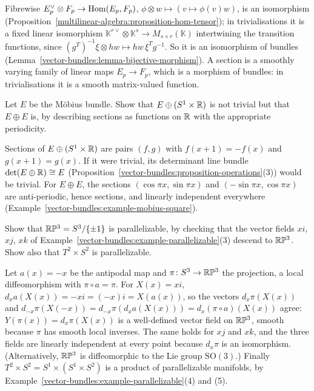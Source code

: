 \begin{solution}
Fibrewise $E_p^\vee \otimes F_p \to \operatorname{Hom}(E_p, F_p)$, $\phi \otimes w \mapsto (v \mapsto \phi(v)w)$, is an isomorphism (Proposition~\ref{multilinear-algebra:proposition-hom-tensor}); in trivialisations
it is a fixed linear isomorphism $\mathbb{K}^{r\vee} \otimes \mathbb{K}^s \to M_{s \times r}(\mathbb{K})$ intertwining the transition functions, since $(g^T)^{-1}\xi \otimes hw \mapsto hw\,\xi^Tg^{-1}$. So
it is an isomorphism of bundles (Lemma~\ref{vector-bundles:lemma-bijective-morphism}). A section is a smoothly varying family of linear maps $E_p \to F_p$, which is a morphism of bundles:
in trivialisations it is a smooth matrix-valued function.
\end{solution}

\begin{exercise}\label{vector-bundles:exercise-sum-mobius-explicit}
Let $E$ be the M\"obius bundle. Show that $E \oplus (S^1 \times \mathbb{R})$ is not trivial but that $E \oplus E$ is, by describing sections as functions on $\mathbb{R}$ with the appropriate periodicity.
\end{exercise}

\begin{solution}
Sections of $E \oplus (S^1 \times \mathbb{R})$ are pairs $(f, g)$ with $f(x + 1) = -f(x)$ and $g(x + 1) = g(x)$. If it were trivial, its determinant line bundle $\det(E \oplus \mathbb{R}) \cong E$
(Proposition~\ref{vector-bundles:proposition-operations}(3)) would be trivial. For $E \oplus E$, the sections $(\cos\pi x, \sin\pi x)$ and $(-\sin\pi x, \cos\pi x)$ are anti-periodic, hence
sections, and linearly independent everywhere (Example~\ref{vector-bundles:example-mobius-square}).
\end{solution}

\begin{exercise}\label{vector-bundles:exercise-rp3-parallelizable}
Show that $\mathbb{R}\mathbb{P}^3 = S^3/\{\pm1\}$ is parallelizable, by checking that the vector fields $xi$, $xj$, $xk$ of Example~\ref{vector-bundles:example-parallelizable}(3) descend to $\mathbb{R}\mathbb{P}^3$. Show also that
$T^2 \times S^2$ is parallelizable.
\end{exercise}

\begin{solution}
Let $a(x) = -x$ be the antipodal map and $\pi \colon S^3 \to \mathbb{R}\mathbb{P}^3$ the projection, a local diffeomorphism with $\pi \circ a = \pi$. For $X(x) = xi$, $d_xa(X(x)) = -xi = (-x)i = X(a(x))$, so the vectors
$d_x\pi(X(x))$ and $d_{-x}\pi(X(-x)) = d_{-x}\pi(d_xa(X(x))) = d_x(\pi \circ a)(X(x))$ agree: $Y(\pi(x)) = d_x\pi(X(x))$ is a well-defined vector field on $\mathbb{R}\mathbb{P}^3$, smooth because $\pi$ has smooth local inverses. The
same holds for $xj$ and $xk$, and the three fields are linearly independent at every point because $d_x\pi$ is an isomorphism. (Alternatively, $\mathbb{R}\mathbb{P}^3$ is diffeomorphic to the Lie group $\mathrm{SO}(3)$.)
Finally $T^2 \times S^2 = S^1 \times (S^1 \times S^2)$ is a product of parallelizable manifolds, by Example~\ref{vector-bundles:example-parallelizable}(4) and (5).
\end{solution}
